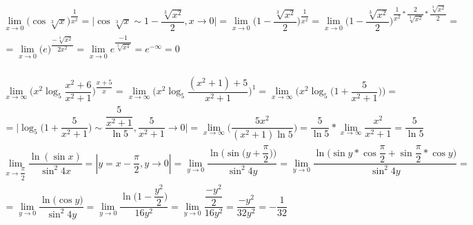 \documentclass[12pt]{article}
\begin{document}
\\
$$
\begin{array}{l}
	\lim\limits_{x\rightarrow0}\biggl(\cos{\sqrt[3]{x}}\biggl)^{\dfrac{1}{x^2}}=\biggl| \cos{\sqrt[3]{x}} \sim 1-\dfrac{\sqrt[3]{x^2}}{2}, x \to 0 \biggl|=\lim\limits_{x\rightarrow0} \biggl(1-\dfrac{\sqrt[3]{x^2}}{2}\biggl)^{\dfrac{1}{x^2}} = \lim\limits_{x\rightarrow0}\biggl(1-\dfrac{\sqrt[3]{x^2}}{2}\biggl)^{\dfrac{1}{x^2}*\dfrac{2}{\sqrt[3]{x^2}}*\dfrac{\sqrt[3]{x^2}}{2}}=\\=\lim\limits_{x\rightarrow0}\biggl(e\biggl)^{\dfrac{-\sqrt[3]{x^2}}{2x^2}}= \lim\limits_{x\rightarrow0}e^{\dfrac{-1}{\sqrt[3]{x^4}}}=e^{-\infty}=0
\end{array}
$$
\\
$$
\begin{array}{l}
\lim\limits_{x\rightarrow\infty} \biggl(x^2\log_{5}\dfrac{x^2+6}{x^2+1}\biggl)^{\dfrac{x+5}{x}}=\lim\limits_{x\rightarrow\infty} \biggl(x^2\log_{5}\dfrac{(x^2+1)+5}{x^2+1}\biggl)^1=\lim\limits_{x\rightarrow\infty}\biggl(x^2\log_{5}\big({1+\dfrac{5}{x^2+1}}\big)\biggl)=\\=\biggl| \log_{5}\biggl({1+\dfrac{5}{x^2+1}}\biggl) \sim \dfrac{\dfrac{5}{x^2+1}}{\ln{5}}, {\dfrac{5}{x^2+1}} \to 0 \biggl|=\lim\limits_{x\rightarrow\infty}\biggl(\dfrac{5x^2}{(x^2+1)\ln{5}}\biggl)=\dfrac{5}{\ln{5}}*\lim\limits_{x\rightarrow\infty}\dfrac{x^2}{x^2+1}=\dfrac{5}{\ln{5}}
\end{array}
$$
$$
\begin{array}{l}
\lim\limits_{x\rightarrow\dfrac{\pi}{2}} \dfrac{\ln(\sin{x})}{\sin^2{4x}}=\left| y=x-\dfrac{\pi}{2}, y \to 0\right|= \lim\limits_{y\rightarrow0}\dfrac{\ln{\biggl(\sin{\big(y+\dfrac{\pi}{2}\big)}\biggl)}}{\sin^2{4y}}=\lim\limits_{y\rightarrow0}\dfrac{\ln{\biggl(\sin{y}*\cos{\dfrac{\pi}{2}}+\sin{\dfrac{\pi}{2}}*\cos{y}\biggl)}}{\sin^2{4y}}=\\=\lim\limits_{y\rightarrow0}\dfrac{\ln{\big(\cos{y}\big)}}{\sin^2{4y}}=\lim\limits_{y\rightarrow0}\dfrac{\ln{\big(1-\dfrac{y^2}{2}\big)}}{16y^2}=\lim\limits_{y\rightarrow0}\dfrac{\dfrac{-y^2}{2}}{16y^2}=\dfrac{-y^2}{32y^2}=-\dfrac{1}{32}
\end{array} $$
\end{document}
